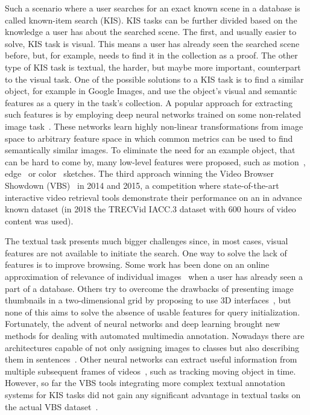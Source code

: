 Such a scenario where a user searches for an exact known scene in a database is called known-item search (KIS). KIS tasks can be further divided based on the knowledge a user has about the searched scene. The first, and usually easier to solve, KIS task is visual. This means a user has already seen the searched scene before, but, for example, needs to find it in the collection as a proof. The other type of KIS task is textual, the harder, but maybe more important, counterpart to the visual task.
One of the possible solutions to a KIS task is to find a similar object, for example in Google Images, and use the object's visual and semantic features as a query in the task's collection. A popular approach for extracting such features is by employing deep neural networks trained on some non-related image task~\cite{deepFeatures}. These networks learn highly non-linear transformations from image space to arbitrary feature space in which common metrics can be used to find semantically similar images.
To eliminate the need for an example object, that can be hard to come by, many low-level features were proposed, such as motion~\cite{motionSketch}, edge~\cite{ITEC2} or color~\cite{sigBrowser} sketches. The third approach winning the Video Browser Showdown (VBS)~\cite{cobarzan2017interactive} in 2014 and 2015, a competition where state-of-the-art interactive video retrieval tools demonstrate their performance on an in advance known dataset (in 2018 the TRECVid IACC.3 dataset with 600 hours of video content was used).

The textual task presents much bigger challenges since, in most cases, visual features are not available to initiate the search. One way to solve the lack of features is to improve browsing. Some work has been done on an online approximation of relevance of individual images~\cite{suditu2011heat} when a user has already seen a part of a database. Others try to overcome the drawbacks of presenting image thumbnails in a two-dimensional grid by proposing to use 3D interfaces~\cite{schoeffmann20143}, but none of this aims to solve the absence of usable features for query initialization. Fortunately, the advent of neural networks and deep learning brought new methods for dealing with automated multimedia annotation. Nowadays there are architectures capable of not only assigning images to classes but also describing them in sentences~\cite{vinyals2017show}. Other neural networks can extract useful information from multiple subsequent frames of videos~\cite{bertinetto2016fully}, such as tracking moving object in time.
However, so far the VBS tools integrating more complex textual annotation systems for KIS tasks did not gain any significant advantage in textual tasks on the actual VBS dataset~\cite{Lokoc-influential-trends}.

